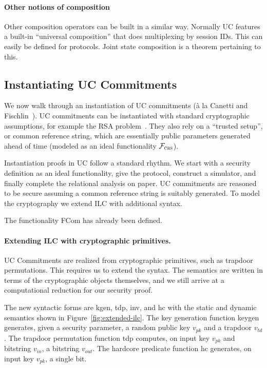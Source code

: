 
\paragraph{Other notions of composition}
Other composition operators can be built in a similar way.
Normally UC features a built-in ``universal composition'' that does multiplexing by  session IDs. This can easily be defined for protocols. 
Joint state composition is a theorem pertaining to this.


\subsection{Instantiating UC Commitments}
\label{subsec:example}
We now walk through an instantiation of UC commitments (\`{a} la Canetti and
Fischlin~\cite{canetti2001commitments}). UC commitments can be instantiated with
standard cryptographic assumptions, for example the RSA
problem~\cite{lindell2014introduction}.  They also rely on a ``trusted setup'',
or common reference string, which are essentially public parameters generated
ahead of time (modeled as an ideal functionality $\mathcal{{F}}_{\textsc{crs}}$).

Instantiation proofs in UC follow a standard rhythm. We start with a security
definition as an ideal functionality, give the protocol, construct a simulator,
and finally complete the relational analysis on paper.  UC commitments are
reasoned to be secure assuming a common reference string is suitably generated.
To model the cryptography we extend ILC with additional syntax.

The functionality FCom has already been defined.

\paragraph{Extending ILC with cryptographic primitives.}
 UC Commitments are realized from
cryptographic primitives, such as trapdoor permutations. This requires us to
extend the syntax. The semantics are written in terms of the cryptographic
objects themselves, and we still arrive at a computational reduction for our
security proof.

The new syntactic forms are \textsf{kgen}, \textsf{tdp}, \textsf{inv}, and
\textsf{hc} with the static and dynamic semantics shown in
Figure~\ref{fig:extended-ilc}. The key generation function \textsf{keygen}
generates, given a security parameter, a random public key $v_{pk}$ and a
trapdoor $v_{td}$. The trapdoor permutation function \textsf{tdp} computes, on
input key $v_{pk}$ and bitstring $v_{in}$, a bitstring $v_{out}$. The hardcore
predicate function \textsf{hc} generates, on input key $v_{pk}$, a single
bit. 


